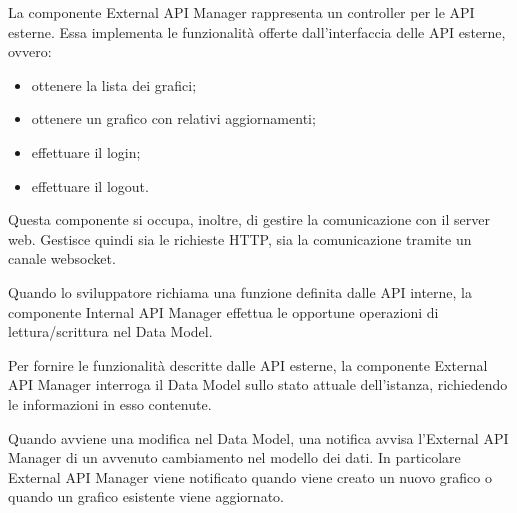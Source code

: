 			La componente External API Manager rappresenta un controller per le API esterne. Essa implementa le funzionalità offerte dall'interfaccia delle API esterne, ovvero:
			\begin{itemize}
				\item ottenere la lista dei grafici;
				\item ottenere un grafico con relativi aggiornamenti;
				\item effettuare il login;
				\item effettuare il logout.
			\end{itemize}
		Questa componente si occupa, inoltre, di gestire la comunicazione con il server web. Gestisce quindi sia le richieste HTTP, sia la comunicazione tramite un canale websocket.


			Quando lo sviluppatore richiama una funzione definita dalle API interne, la componente Internal API Manager effettua le opportune operazioni di lettura/scrittura nel Data Model.

			Per fornire le funzionalità descritte dalle API esterne, la componente External API Manager interroga il Data Model sullo stato attuale dell'istanza, richiedendo le informazioni in esso contenute.

			Quando avviene una modifica nel Data Model, una notifica avvisa l'External API Manager di un avvenuto cambiamento nel modello dei dati. In particolare External API Manager viene notificato quando viene creato un nuovo grafico o quando un grafico esistente viene aggiornato.
